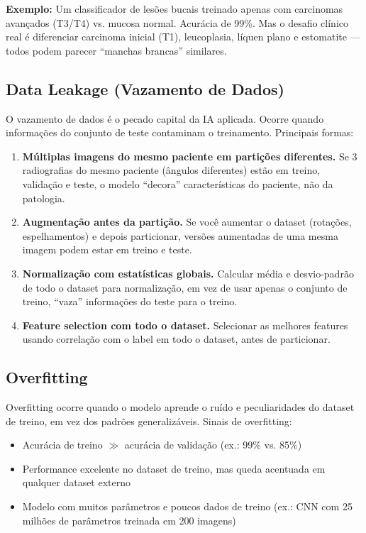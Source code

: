 \textbf{Exemplo:} Um classificador de lesões bucais treinado apenas com carcinomas avançados (T3/T4) vs. mucosa normal. Acurácia de 99\%. Mas o desafio clínico real é diferenciar carcinoma inicial (T1), leucoplasia, líquen plano e estomatite — todos podem parecer ``manchas brancas'' similares.

\subsection{Data Leakage (Vazamento de Dados)}

O vazamento de dados  é o pecado capital da IA aplicada. Ocorre quando informações do conjunto de teste contaminam o treinamento. Principais formas:

\begin{enumerate}
    \item \textbf{Múltiplas imagens do mesmo paciente em partições diferentes.} Se 3 radiografias do mesmo paciente (ângulos diferentes) estão em treino, validação e teste, o modelo ``decora'' características do paciente, não da patologia.
    \item \textbf{Augmentação antes da partição.} Se você aumentar o dataset (rotações, espelhamentos) e depois particionar, versões aumentadas de uma mesma imagem podem estar em treino e teste.
    \item \textbf{Normalização com estatísticas globais.} Calcular média e desvio-padrão de todo o dataset para normalização, em vez de usar apenas o conjunto de treino, ``vaza'' informações do teste para o treino.
    \item \textbf{Feature selection com todo o dataset.} Selecionar as melhores features usando correlação com o label em todo o dataset, antes de particionar.
\end{enumerate}

\subsection{Overfitting}

Overfitting  ocorre quando o modelo aprende o ruído e peculiaridades do dataset de treino, em vez dos padrões generalizáveis. Sinais de overfitting:

\begin{itemize}
    \item Acurácia de treino $\gg$ acurácia de validação (ex.: 99\% vs. 85\%)
    \item Performance excelente no dataset de treino, mas queda acentuada em qualquer dataset externo
    \item Modelo com muitos parâmetros e poucos dados de treino (ex.: CNN com 25 milhões de parâmetros treinada em 200 imagens)
\end{itemize}

